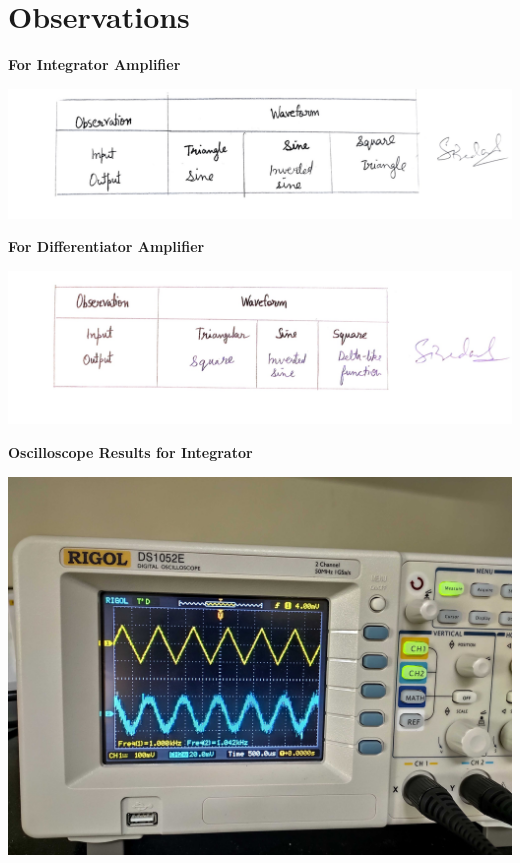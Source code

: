 \section{Observations}
\begin{center}
    \textbf{For Integrator Amplifier}
\end{center}
\begin{center}
    \includegraphics[scale = 0.15]{Documents/int.jpg}
\end{center}
\begin{center}
    \textbf{For Differentiator Amplifier}
\end{center}
\begin{center}
    \includegraphics[scale = 0.15]{Documents/diff.jpg}
\end{center}
\begin{center}
    \textbf{Oscilloscope Results for Integrator}
\end{center}
\begin{center}
    \includegraphics[scale = 0.09]{Documents/Int. Triangle.jpg}
\end{center}
